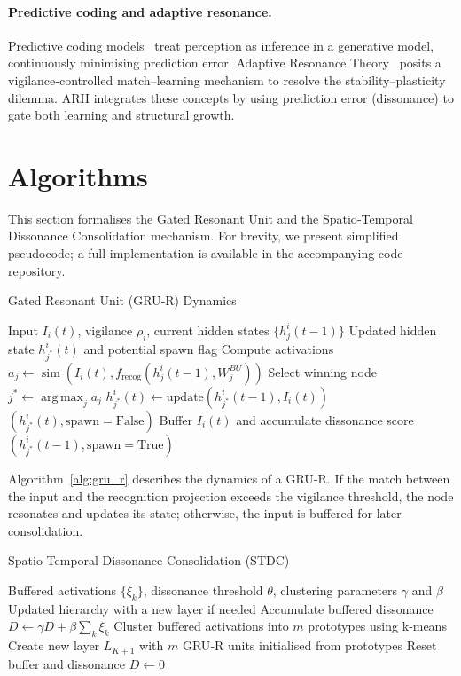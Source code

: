 \documentclass{article}
\DeclareMathOperator*{\argmax}{arg\,max}
\DeclareMathOperator{\simop}{sim}
\begin{document}
\paragraph{Predictive coding and adaptive resonance.}  Predictive coding models \citep{Rao1999,Friston2005} treat perception as inference in a generative model, continuously minimising prediction error.  Adaptive Resonance Theory \citep{Grossberg1987} posits a vigilance‑controlled match–learning mechanism to resolve the stability–plasticity dilemma.  ARH integrates these concepts by using prediction error (dissonance) to gate both learning and structural growth.

\section{Algorithms}

This section formalises the Gated Resonant Unit and the Spatio‑Temporal Dissonance Consolidation mechanism.  For brevity, we present simplified pseudocode; a full implementation is available in the accompanying code repository.

\begin{algorithm}[t]
\caption{Gated Resonant Unit (GRU‑R) Dynamics}
\label{alg:gru_r}
\begin{algorithmic}[1]
\Require Input $I_i(t)$, vigilance $\rho_i$, current hidden states $\{h_j^i(t-1)\}$
\Ensure Updated hidden state $h_{j^*}^i(t)$ and potential spawn flag
\State Compute activations $a_j \gets \simop(I_i(t), f_{\text{recog}}(h_j^i(t-1), W_j^{BU}))$
\State Select winning node $j^* \gets \argmax_j a_j$
    \State $h_{j^*}^i(t) \gets \text{update}(h_{j^*}^i(t-1), I_i(t))$
    \State \Return $(h_{j^*}^i(t), \text{spawn}=\text{False})$
\Else
    \State Buffer $I_i(t)$ and accumulate dissonance score
    \State \Return $(h_{j^*}^i(t-1), \text{spawn}=\text{True})$
\EndIf
\end{algorithmic}
\end{algorithm}

Algorithm \ref{alg:gru_r} describes the dynamics of a GRU‑R.  If the match between the input and the recognition projection exceeds the vigilance threshold, the node resonates and updates its state; otherwise, the input is buffered for later consolidation.

\begin{algorithm}[t]
\caption{Spatio‑Temporal Dissonance Consolidation (STDC)}
\label{alg:stdc}
\begin{algorithmic}[1]
\Require Buffered activations $\{\xi_k\}$, dissonance threshold $\theta$, clustering parameters $\gamma$ and $\beta$
\Ensure Updated hierarchy with a new layer if needed
\State Accumulate buffered dissonance $D \gets \gamma D + \beta \sum_k \xi_k$
    \State Cluster buffered activations into $m$ prototypes using k‑means
    \State Create new layer $L_{K+1}$ with $m$ GRU‑R units initialised from prototypes
    \State Reset buffer and dissonance $D \gets 0$
\EndIf
\end{algorithmic}
\end{algorithm}
\end{document}
